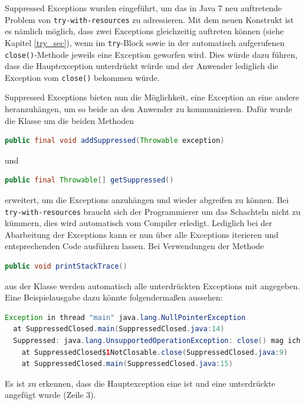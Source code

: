 \documentclass[times, 10pt,twocolumn]{article}
\begin{document}
\label{supp_exception_subsec}
Suppressed Exceptions wurden eingeführt, um das in Java 7 neu auftretende Problem von \texttt{try-with-resources} zu adressieren.
Mit dem neuen Konstrukt ist es nämlich möglich, dass zwei Exceptions gleichzeitig auftreten können (siehe Kapitel \ref{try_sec}), wenn im
\texttt{try}-Block sowie in der automatisch aufgerufenen \texttt{close()}-Methode jeweils eine Exception geworfen wird. Dies würde
dazu führen, dass die Hauptexception unterdrückt würde und der Anwender lediglich die Exception vom \texttt{close()} bekommen würde.

Suppressed Exceptions bieten nun die Möglichkeit, eine Exception an eine andere heranzuhängen, um so beide an den Anwender zu
kommunizieren. Dafür wurde die Klasse  um die beiden Methoden 
\begin{lstlisting}[language=java,breaklines=true]
public final void addSuppressed(Throwable exception)
\end{lstlisting}
und 
\begin{lstlisting}[language=java,breaklines=true]
public final Throwable[] getSuppressed()
\end{lstlisting}
erweitert, um die Exceptions anzuhängen und wieder abgreifen zu können. 
Bei \texttt{try-with-resources} braucht sich der Programmierer um das Schachteln nicht zu kümmern, dies wird 
automatisch vom Compiler erledigt.\cite{sbJ7coin} Lediglich bei der Abarbeitung der Exceptions kann er nun über
alle Exceptions iterieren und entsprechenden Code ausführen lassen. Bei Verwendungen der Methode
\begin{lstlisting}[language=java,breaklines=true]
public void printStackTrace()
\end{lstlisting}
aus der Klasse  werden automatisch alle unterdrückten Exceptions mit angegeben. Eine Beispielausgabe dazu könnte
folgendermaßen aussehen\cite{javainsel2}:
\begin{lstlisting}[language=java,breaklines=true]
Exception in thread "main" java.lang.NullPointerException
  at SuppressedClosed.main(SuppressedClosed.java:14)
  Suppressed: java.lang.UnsupportedOperationException: close() mag ich nicht
    at SuppressedClosed$1NotClosable.close(SuppressedClosed.java:9)
    at SuppressedClosed.main(SuppressedClosed.java:15)
\end{lstlisting}

Es ist zu erkennen, dass die Hauptexception eine  ist und eine unterdrückte 
 angefügt wurde (Zeile 3).
\end{document}
